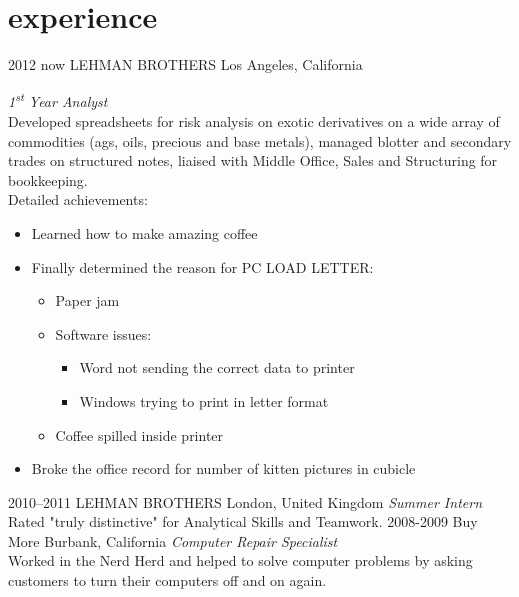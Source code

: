 \documentclass[]{k-cv} %
\begin{document}
\section{experience}

\begin{entrylist}
\entry
{2012 \to now}
{LEHMAN BROTHERS}
{Los Angeles, California}
{\emph{1\textsuperscript{st} Year Analyst} \\
Developed spreadsheets for risk analysis on exotic derivatives on a wide array 
of commodities (ags, oils, precious and base metals), managed blotter and 
secondary trades on structured notes, liaised with Middle Office, Sales and 
Structuring for bookkeeping. \\
Detailed achievements:
\begin{itemize}
\item Learned how to make amazing coffee
\item Finally determined the reason for \textsc{PC LOAD LETTER}:
\begin{itemize}
\item Paper jam
\item Software issues:
\begin{itemize}
\item Word not sending the correct data to printer
\item Windows trying to print in letter format
\end{itemize}
\item Coffee spilled inside printer
\end{itemize}
\item Broke the office record for number of kitten pictures in cubicle
\end{itemize}}
\entry
{2010--2011}
{LEHMAN BROTHERS}
{London, United Kingdom}
{\emph{Summer Intern} \\
Rated "truly distinctive" for Analytical Skills and Teamwork.}
\entry
{2008-2009}
{Buy More}
{Burbank, California}
{\emph{Computer Repair Specialist} \\
Worked in the Nerd Herd and helped to solve computer problems by asking 
customers to turn their computers off and on again.}
\end{entrylist}

\clearpage

\end{document}
